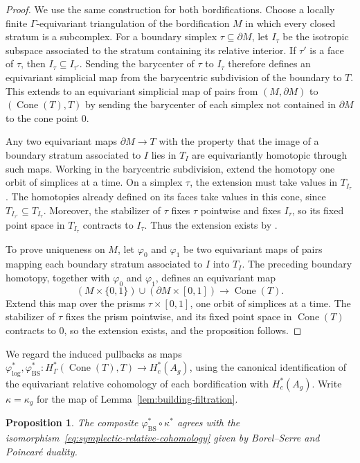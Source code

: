 \documentclass[12 pt]{amsart}
\newcommand{\BS}{\mathrm{BS}}
\newcommand{\Cone}{\operatorname{Cone}}
\newcommand{\<}{\langle}
\renewcommand{\>}{\rangle}
\newtheorem{proposition}[theorem]{Proposition}
\theoremstyle{definition}
\begin{document}
\begin{proof}
We use the same construction for both bordifications. Choose a locally finite $\Gamma$-equivariant triangulation of the bordification $M$ in which every closed stratum is a subcomplex. For a boundary simplex $\tau \subseteq \partial M$, let $I_\tau$ be the isotropic subspace associated to the stratum containing its relative interior. If $\tau'$ is a face of $\tau$, then $I_\tau \subseteq I_{\tau'}$. Sending the barycenter of $\tau$ to $I_\tau$ therefore defines an equivariant simplicial map from the barycentric subdivision of the boundary to $T$. This extends to an equivariant simplicial map of pairs from $(M, \partial M)$ to $(\Cone(T), T)$ by sending the barycenter of each simplex not contained in $\partial M$ to the cone point $0$.

Any two equivariant maps $\partial M \to T$ with the property that the image of a boundary stratum associated to $I$ lies in $T_I$ are equivariantly homotopic through such maps. Working in the barycentric subdivision, extend the homotopy one orbit of simplices at a time. On a simplex $\tau$, the extension must take values in $T_{I_\tau}$. The homotopies already defined on its faces take values in this cone, since $T_{I_{\tau'}} \subseteq T_{I_\tau}$. Moreover, the stabilizer of $\tau$ fixes $\tau$ pointwise and fixes $I_\tau$, so its fixed point space in $T_{I_\tau}$ contracts to $I_\tau$. Thus the extension exists by \cite[Chapter~II, \S1]{Bredon}.

To prove uniqueness on $M$, let $\varphi_0$ and $\varphi_1$ be two equivariant maps of pairs mapping each boundary stratum associated to $I$ into $T_I$. The preceding boundary homotopy, together with $\varphi_0$ and $\varphi_1$, defines an equivariant map
\[
(M \times \{0, 1\}) \cup (\partial M \times [0, 1]) \longrightarrow \Cone(T).
\]
Extend this map over the prisms $\tau \times [0, 1]$, one orbit of simplices at a time. The stabilizer of $\tau$ fixes the prism pointwise, and its fixed point space in $\Cone(T)$ contracts to $0$, so the extension exists, and the proposition follows.
\end{proof}

We regard the induced pullbacks as maps $\varphi_{\log}^*, \varphi_{\BS}^* \colon H_\Gamma^*(\Cone(T), T) \to H_c^*(A_g)$, using the canonical identification of the equivariant relative cohomology of each bordification with $H_c^*(A_g)$. Write $\kappa = \kappa_g$ for the map of Lemma~\ref{lem:building-filtration}.

\begin{proposition}\label{prop:BS-duality}
The composite $\varphi_{\BS}^* \circ \kappa^*$ agrees with the isomorphism~\eqref{eq:symplectic-relative-cohomology} given by Borel--Serre and Poincar\'e duality.
\end{proposition}
\end{document}
